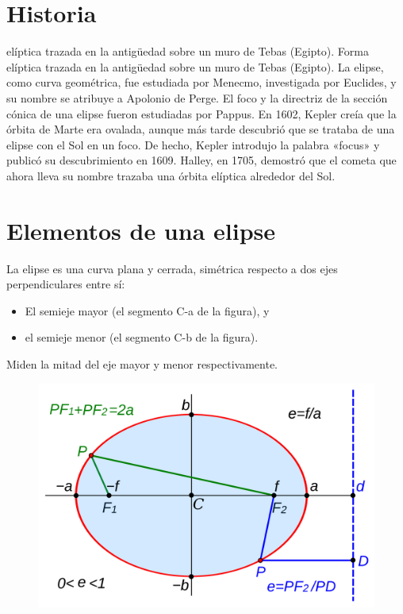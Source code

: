\documentclass[a2,plainboxedsections]{sciposter}
\title{\color{blue}{Elipse}}
\author{Juan M. Barrios}
\institute{CSC, Facultad de Ciencias\\
	Universidad Nacional Autónoma de México\\}
\begin{document}
\maketitle

\begin{multicols}{3}

\section{Historia}

\color{magenta}  elíptica trazada en la antigüedad sobre un muro de Tebas (Egipto). \color{black}
Forma elíptica trazada en la antigüedad sobre un muro de Tebas (Egipto).
La elipse, como curva geométrica, fue estudiada por Menecmo, investigada por Euclides, y su nombre se atribuye a Apolonio de Perge. El foco y la directriz de la sección cónica de una elipse fueron estudiadas por Pappus. En 1602, Kepler creía que la órbita de Marte era ovalada, aunque más tarde descubrió que se trataba de una elipse con el Sol en un foco. De hecho, Kepler introdujo la palabra «focus» y publicó su descubrimiento en 1609. Halley, en 1705, demostró que el cometa que ahora lleva su nombre trazaba una órbita elíptica alrededor del Sol.

\section{Elementos de una elipse}
La elipse es una curva plana y cerrada, simétrica respecto a dos ejes perpendiculares entre sí:
\begin{itemize}
	\item El semieje mayor (el segmento C-a de la figura), y
	\item el semieje menor (el segmento C-b de la figura).
\end{itemize}
Miden la mitad del eje mayor y menor respectivamente.

\begin{figure}
	\includegraphics[width=\textwidth]{elipse1}
\end{figure}


\end{multicols}
\end{document}
